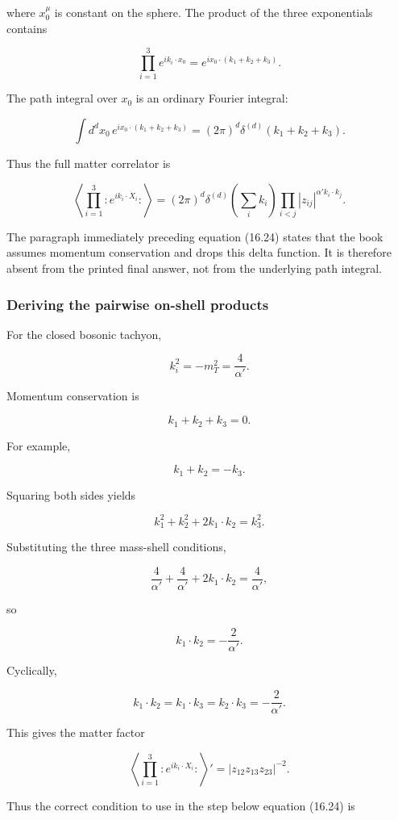 \documentclass[
  10pt,
  a4paper,
  openany]{book}
\begin{document}
where \(x_0^\mu\) is constant on the sphere. The product of the three
exponentials contains

\[
\prod_{i=1}^3e^{ik_i\cdot x_0}
=e^{ix_0\cdot(k_1+k_2+k_3)}.
\]

The path integral over \(x_0\) is an ordinary Fourier integral:

\[
\int d^dx_0\,
e^{ix_0\cdot(k_1+k_2+k_3)}
=(2\pi)^d\delta^{(d)}(k_1+k_2+k_3).
\]

Thus the full matter correlator is

\[
\left\langle
\prod_{i=1}^3:e^{ik_i\cdot X_i}:
\right\rangle
=(2\pi)^d\delta^{(d)}\!\left(\sum_i k_i\right)
\prod_{i<j}|z_{ij}|^{\alpha'k_i\cdot k_j}.
\]

The paragraph immediately preceding equation (16.24) states that the
book assumes momentum conservation and drops this delta function. It is
therefore absent from the printed final answer, not from the underlying
path integral.

\subsubsection{Deriving the pairwise on-shell
products}\label{deriving-the-pairwise-on-shell-products}

For the closed bosonic tachyon,

\[
k_i^2=-m_T^2=\frac4{\alpha'}.
\]

Momentum conservation is

\[
k_1+k_2+k_3=0.
\]

For example,

\[
k_1+k_2=-k_3.
\]

Squaring both sides yields

\[
k_1^2+k_2^2+2k_1\cdot k_2=k_3^2.
\]

Substituting the three mass-shell conditions,

\[
\frac4{\alpha'}+\frac4{\alpha'}
+2k_1\cdot k_2
=\frac4{\alpha'},
\]

so

\[
k_1\cdot k_2=-\frac2{\alpha'}.
\]

Cyclically,

\[
\boxed{
k_1\cdot k_2
=k_1\cdot k_3
=k_2\cdot k_3
=-\frac2{\alpha'}.
}
\]

This gives the matter factor

\[
\left\langle\prod_{i=1}^3:e^{ik_i\cdot X_i}:\right\rangle'
=|z_{12}z_{13}z_{23}|^{-2}.
\]

Thus the correct condition to use in the step below equation (16.24) is
\end{document}

